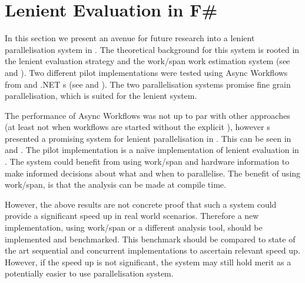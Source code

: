 \section{Lenient Evaluation in F\#}
In this section we present an avenue for future research into a lenient parallelisation system in \fs. The theoretical background for this system is rooted in the lenient evaluation strategy and the work/span work estimation system (see  and ). Two different pilot implementations were tested using Async Workflows from \fs and .NET s (see  and ). The two parallelisation systems promise fine grain parallelisation, which is suited for the lenient system.

The performance of Async Workflows was not up to par with other approaches (at least not when workflows are started without the explicit ), however s presented a promising system for lenient parallelisation in \fs. This can be seen in  and . The pilot implementation is a naïve implementation of lenient evaluation in \fs. The system could benefit from using work/span and hardware information to make informed decisions about what and when to parallelise. The benefit of using work/span, is that the analysis can be made at compile time.

However, the above results are not concrete proof that such a system could provide a significant speed up in real world scenarios. Therefore a new implementation, using work/span or a different analysis tool, should be implemented and benchmarked. This benchmark should be compared to state of the art sequential and concurrent implementations to ascertain relevant speed up. However, if the speed up is not significant, the system may still hold merit as a potentially easier to use parallelisation system.
